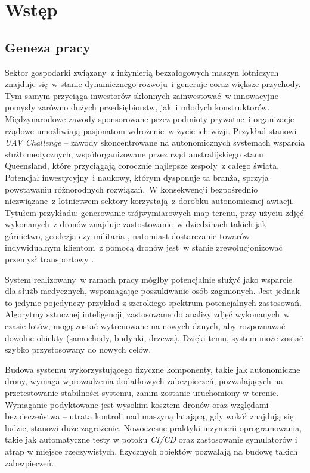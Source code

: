 \chapter{Wstęp} \label{chapter_intro}


\section{Geneza pracy} \label{intro_genesis}

Sektor gospodarki związany~z inżynierią bezzałogowych maszyn lotniczych znajduje się~w
stanie dynamicznego rozwoju~i generuje coraz większe przychody.
Tym samym przyciąga inwestorów skłonnych zainwestować~w innowacyjne pomysły zarówno 
dużych przedsiębiorstw, jak~i młodych konstruktorów. Międzynarodowe zawody sponsorowane
przez podmioty prywatne~i organizacje rządowe umożliwiają pasjonatom wdrożenie~w życie
ich wizji. Przykład stanowi \textit{UAV Challenge} -- zawody skoncentrowane na
autonomicznych systemach wsparcia służb medycznych, współorganizowane przez rząd
australijskiego stanu Queensland, które przyciągają corocznie najlepsze zespoły~z całego
świata\cite{uav_sponsors}. Potencjał inwestycyjny~i naukowy, którym dysponuje ta branża,
sprzyja powstawaniu różnorodnych rozwiązań.~W konsekwencji bezpośrednio niezwiązane~z lotnictwem sektory korzystają~z dorobku autonomicznej awiacji.
Tytułem przykładu: generowanie trójwymiarowych map terenu, przy użyciu zdjęć wykonanych~z dronów znajduje
zastostowanie~w dziedzinach takich jak górnictwo, geodezja czy militaria
\cite{uav_photogrametry}, natomiast dostarczanie towarów indywidualnym klientom~z pomocą
dronów jest~w stanie zrewolucjonizować przemysł transportowy \cite{prime_air}.

System realizowany~w ramach pracy mógłby potencjalnie służyć jako wsparcie dla służb
medycznych, wspomagając poszukiwanie osób zaginionych. Jest jednak to jedynie pojedynczy 
przykład z szerokiego spektrum potencjalnych zastosowań. Algorytmy sztucznej inteligencji,
zastosowane do analizy zdjęć wykonanych~w czasie lotów, mogą zostać wytrenowane
na nowych danych, aby rozpoznawać dowolne obiekty (samochody, budynki, drzewa). 
Dzięki temu, system może zostać szybko przystosowany do nowych celów.

Budowa systemu wykorzystującego fizyczne komponenty, takie jak autonomiczne drony,
wymaga wprowadzenia dodatkowych zabezpieczeń, pozwalających na przetestowanie stabilności
systemu, zanim zostanie uruchomiony w terenie. Wymaganie podyktowane jest wysokim kosztem
dronów oraz względami bezpieczeństwa -- utrata kontroli nad maszyną latającą, gdy wokół znajdują
się ludzie, stanowi duże zagrożenie. Nowoczesne praktyki inżynierii oprogramowania, takie jak 
automatyczne testy w potoku \textit{CI/CD} oraz zastosowanie symulatorów i atrap
w miejsce rzeczywistych, fizycznych obiektów pozwalają na budowę takich zabezpieczeń.

